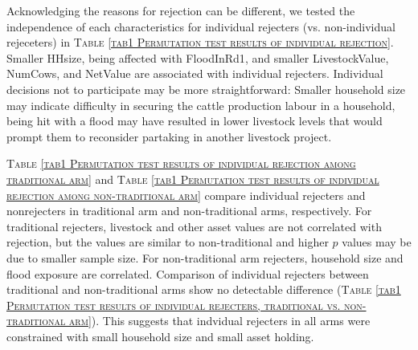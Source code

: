 	Acknowledging the reasons for rejection can be different, we tested the independence of each characteristics for individual rejecters (vs. non-individual rejeceters) in \textsc{\normalsize Table \ref{tab1 Permutation test results of individual rejection}}. Smaller \textsf{HHsize}, being affected with \textsf{FloodInRd1}, and smaller \textsf{LivestockValue}, \textsf{NumCows}, and \textsf{NetValue} are associated with individual rejecters. Individual decisions not to participate may be more straightforward: Smaller household size may indicate difficulty in securing the cattle production labour in a household, being hit with a flood may have resulted in lower livestock levels that would prompt them to reconsider partaking in another livestock project. 

	\textsc{\normalsize Table \ref{tab1 Permutation test results of individual rejection among traditional arm}} and \textsc{\normalsize Table \ref{tab1 Permutation test results of individual rejection among non-traditional arm}} compare individual rejecters and nonrejecters in \textsf{traditional} arm and non-\textsf{traditional} arms, respectively. For \textsf{traditional} rejecters, livestock and other asset values are not correlated with rejection, but the values are similar to non-\textsf{traditional} and higher $p$ values may be due to smaller sample size. For non-\textsf{traditional} arm rejecters, household size and flood exposure are correlated. Comparison of individual rejecters between \textsf{traditional} and non-\textsf{traditional} arms show no detectable difference (\textsc{\normalsize Table \ref{tab1 Permutation test results of individual rejecters, traditional vs. non-traditional arm}}). This suggests that indvidual rejecters in all arms were constrained with small household size and small asset holding.




